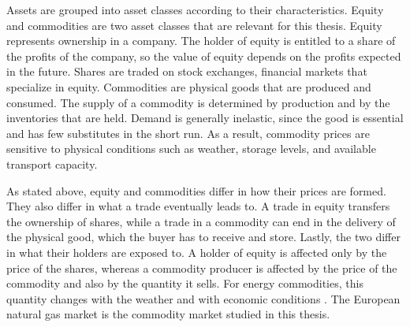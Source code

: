 Assets are grouped into asset classes according to their characteristics. Equity and commodities are two asset classes that are relevant for this thesis. Equity represents ownership in a company. The holder of equity is entitled to a share of the profits of the company, so the value of equity depends on the profits expected in the future. Shares are traded on stock exchanges, financial markets that specialize in equity. Commodities are physical goods that are produced and consumed. The supply of a commodity is determined by production and by the inventories that are held. Demand is generally inelastic, since the good is essential and has few substitutes in the short run. As a result, commodity prices are sensitive to physical conditions such as weather, storage levels, and available transport capacity.

As stated above, equity and commodities differ in how their prices are formed. They also differ in what a trade eventually leads to. A trade in equity transfers the ownership of shares, while a trade in a commodity can end in the delivery of the physical good, which the buyer has to receive and store. Lastly, the two differ in what their holders are exposed to. A holder of equity is affected only by the price of the shares, whereas a commodity producer is affected by the price of the commodity and also by the quantity it sells. For energy commodities, this quantity changes with the weather and with economic conditions \parencite{gemanCommoditiesCommodityDerivatives2005}. The European natural gas market is the commodity market studied in this thesis.